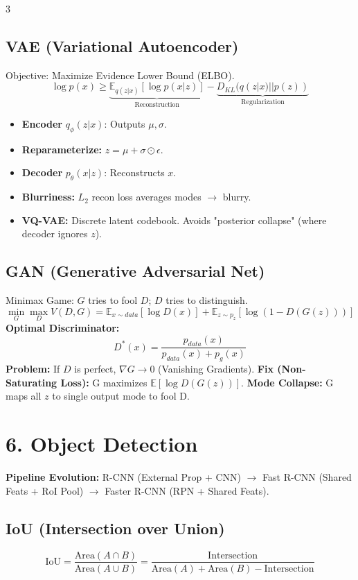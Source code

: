 \documentclass[10pt]{article}
\newcommand{\E}{\mathbb{E}}
\begin{document}
\begin{multicols*}{3}
\subsection*{VAE (Variational Autoencoder)}
Objective: Maximize Evidence Lower Bound (ELBO).
$$ \log p(x) \ge \underbrace{\E_{q(z|x)}[\log p(x|z)]}_{\text{Reconstruction}} - \underbrace{D_{KL}(q(z|x) || p(z))}_{\text{Regularization}} $$
\begin{itemize}
    \item \textbf{Encoder} $q_\phi(z|x)$: Outputs $\mu, \sigma$.
    \item \textbf{Reparameterize:} $z = \mu + \sigma \odot \epsilon$.
    \item \textbf{Decoder} $p_\theta(x|z)$: Reconstructs $x$.
    \item \textbf{Blurriness:} $L_2$ recon loss averages modes $\to$ blurry.
    \item \textbf{VQ-VAE:} Discrete latent codebook. Avoids "posterior collapse" (where decoder ignores $z$).
\end{itemize}

\subsection*{GAN (Generative Adversarial Net)}
Minimax Game: $G$ tries to fool $D$; $D$ tries to distinguish.
$$ \min_G \max_D V(D, G) = \E_{x \sim data}[\log D(x)] + \E_{z \sim p_z}[\log(1 - D(G(z)))] $$
\textbf{Optimal Discriminator:}
$$ D^*(x) = \frac{p_{data}(x)}{p_{data}(x) + p_g(x)} $$
\textbf{Problem:} If $D$ is perfect, $\nabla G \to 0$ (Vanishing Gradients).
\textbf{Fix (Non-Saturating Loss):} G maximizes $\E[\log D(G(z))]$.
\textbf{Mode Collapse:} G maps all $z$ to single output mode to fool D.

\section*{6. Object Detection}
\textbf{Pipeline Evolution:}
R-CNN (External Prop + CNN) $\to$ Fast R-CNN (Shared Feats + RoI Pool) $\to$ Faster R-CNN (RPN + Shared Feats).

\subsection*{IoU (Intersection over Union)}
$$ \text{IoU} = \frac{\text{Area}(A \cap B)}{\text{Area}(A \cup B)} = \frac{\text{Intersection}}{\text{Area}(A) + \text{Area}(B) - \text{Intersection}} $$


\end{multicols*}
\end{document}
